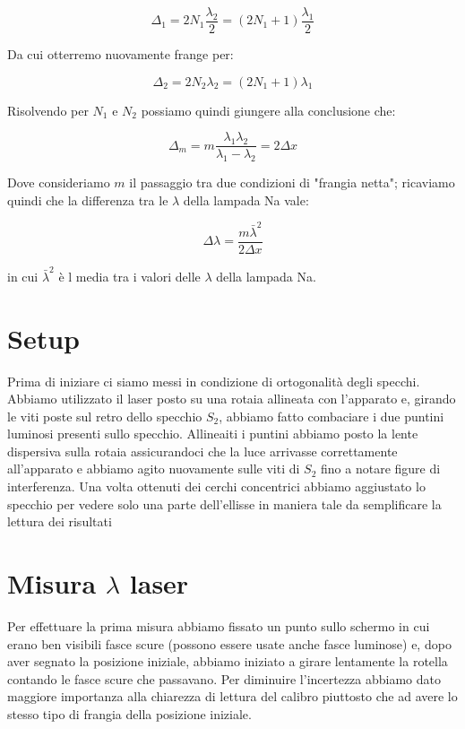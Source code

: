 \documentclass{article}
\begin{document}
\begin{equation} 
\Delta_1 = 2 N_1 \frac{\lambda_2}{2} = (2 N_1 + 1) \frac{\lambda_1}{2} 
\end{equation}

Da cui otterremo nuovamente frange per:

\begin{equation} 
\Delta_2 = 2N_2 \lambda_2 =(2 N_1 + 1) \lambda_1 
\end{equation}

Risolvendo per $N_1$ e $N_2$ possiamo quindi giungere alla conclusione che:

\begin{equation} 
\Delta_m = m \frac{\lambda_1 \lambda_2}{\lambda_1 {-} \lambda_2} = 2 \Delta{x} 
\end{equation}

Dove consideriamo $m$ il passaggio tra due condizioni di "frangia netta"; ricaviamo quindi che la differenza tra le $\lambda$ della lampada Na vale:

\begin{equation} 
\Delta{\lambda} = \frac{m \bar \lambda^2}{2 \Delta{x}} 
\end{equation}

in cui $ \bar \lambda^2$ è l media tra i valori delle $\lambda$ della lampada Na.




\section{Setup}
Prima di iniziare ci siamo messi in condizione di ortogonalità degli specchi. Abbiamo utilizzato il laser posto su una rotaia allineata con l'apparato e, girando le viti poste sul retro dello specchio $S_2$, abbiamo fatto combaciare i due puntini luminosi presenti sullo specchio. Allineaiti i puntini abbiamo posto la lente dispersiva sulla rotaia assicurandoci che la luce arrivasse correttamente all'apparato e abbiamo agito nuovamente sulle viti di $S_2$ fino a notare figure di interferenza. Una volta ottenuti dei cerchi concentrici abbiamo aggiustato lo specchio per vedere solo una parte dell'ellisse in maniera tale da semplificare la lettura dei risultati




\section{Misura $\lambda$ laser}
Per effettuare la prima misura abbiamo fissato un punto sullo schermo in cui erano ben visibili fasce scure (possono essere usate anche fasce luminose) e, dopo aver segnato la posizione iniziale, abbiamo iniziato a girare lentamente la rotella contando le fasce scure che passavano. Per diminuire l'incertezza abbiamo dato maggiore importanza alla chiarezza di lettura del calibro piuttosto che ad avere lo stesso tipo di frangia della posizione iniziale.
\end{document}

